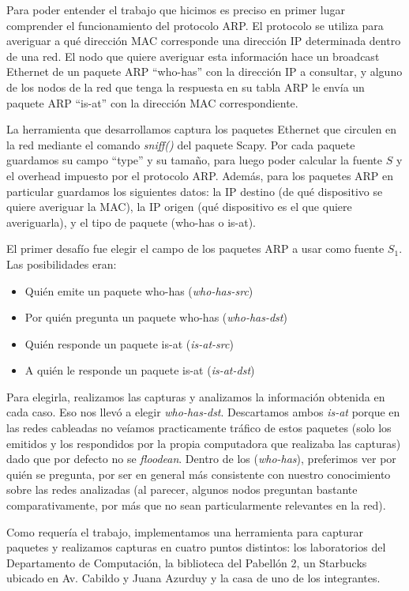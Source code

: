 Para poder entender el trabajo que hicimos es preciso en primer lugar comprender
el funcionamiento del protocolo ARP. El protocolo se utiliza para averiguar a
qué dirección MAC corresponde una dirección IP determinada dentro de una red. El
nodo que quiere averiguar esta información hace un broadcast Ethernet de un
paquete ARP ``who-has'' con la dirección IP a consultar, y alguno de los nodos
de la red que tenga la respuesta en su tabla ARP le envía un paquete ARP
``is-at'' con la dirección MAC correspondiente.

La herramienta que desarrollamos captura los paquetes Ethernet que circulen en la red mediante el comando \textit{sniff()} del paquete Scapy.
Por cada paquete guardamos su campo ``type'' y su tamaño, para luego poder calcular la fuente $S$ y el overhead impuesto por el protocolo ARP.
Además, para los paquetes ARP en particular guardamos los siguientes datos: la IP destino (de qué dispositivo se quiere averiguar la MAC), la IP origen (qué dispositivo es el que quiere averiguarla), y el tipo de paquete (who-has o is-at).

El primer desafío fue elegir el campo de los paquetes ARP a usar como fuente $S_1$. Las posibilidades eran:
\begin{itemize}
	\item Quién emite un paquete who-has (\textit{who-has-src})
    \item Por quién pregunta un paquete who-has (\textit{who-has-dst})
    \item Quién responde un paquete is-at (\textit{is-at-src})
    \item A quién le responde un paquete is-at (\textit{is-at-dst})
\end{itemize}

Para elegirla, realizamos las capturas y analizamos la información obtenida en cada caso. Eso nos llevó a elegir \textit{who-has-dst}. Descartamos ambos \textit{is-at} porque en las redes cableadas no veíamos practicamente tráfico de estos paquetes (solo los emitidos y los respondidos por la propia computadora que realizaba las capturas) dado que por defecto no se \textit{floodean}. Dentro de los (\textit{who-has}), preferimos ver por quién se pregunta, por ser en general más consistente con nuestro conocimiento sobre las redes analizadas (al parecer, algunos nodos preguntan bastante comparativamente, por más que no sean particularmente relevantes en la red).

Como requería el trabajo, implementamos una herramienta para capturar paquetes y realizamos capturas en cuatro puntos distintos: los laboratorios del Departamento de Computación, la biblioteca del Pabellón 2, un Starbucks ubicado en Av. Cabildo y Juana Azurduy y la casa de uno de los integrantes.



